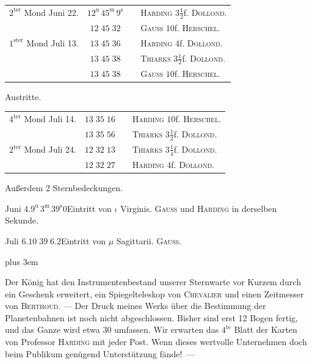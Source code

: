 \begin{center}
\fontsize{10}{12}\selectfont\setlength{\tabcolsep}{3pt}\begin{tabular}{lccl}
$2^{\text{ter}}$ Mond Juni 22. & $12^{\text{u}}\,45^{\text{m}}\,9^{\text{s}}$ & & \textsc{Harding} $3\tfrac12$f. \textsc{Dollond}.\\
& $12\;45\;32$ & & \textsc{Gauss} $10$f. \textsc{Herschel}.\\
$1^{\text{ster}}$ Mond Juli 13. & $13\;45\;36$ & & \textsc{Harding} $4$f. \textsc{Dollond}.\\
& $13\;45\;38$ & & \textsc{Thiarks} $3\tfrac12$f. \textsc{Dollond}.\\
& $13\;45\;38$ & & \textsc{Gauss} $10$f. \textsc{Herschel}.\\
\end{tabular}

Austritte.

\fontsize{10}{12}\selectfont\setlength{\tabcolsep}{3pt}\begin{tabular}{lccl}
$4^{\text{ter}}$ Mond Juli 14. & $13\;35\;16$ & & \textsc{Harding} $10$f. \textsc{Herschel}.\\
& $13\;35\;56$ & & \textsc{Thiarks} $3\tfrac12$f. \textsc{Dollond}.\\
$2^{\text{ter}}$ Mond Juli 24. & $12\;32\;13$ & & \textsc{Thiarks} $3\tfrac14$f. \textsc{Dollond}.\\
& $12\;32\;27$ & & \textsc{Harding} $4$f. \textsc{Dollond}.\\
\end{tabular}
\end{center}

\par\indent Außerdem 2 Sternbedeckungen.

\smallskip
\noindent Juni 4.\quad $9^{\text{u}}\,3^{\text{m}}\,39^{\text{s}}0$\quad Eintritt von $\iota$ Virginis. \textsc{Gauss} und \textsc{Harding} in derselben Sekunde.

\smallskip
\noindent Juli 6.\quad $10\;39\;6.2$\quad Eintritt von $\mu$ Sagittarii. \textsc{Gauss}.

\smallskip
{\rightskip=0pt plus 3em\par\indent Der König hat den Instrumentenbestand unserer Sternwarte vor Kurzem durch ein Geschenk erweitert, ein Spiegelteleskop von \textsc{Chevalier} und einen Zeitmesser von \textsc{Berthoud}. --- Der Druck meines
Werks über die Bestimmung der Planetenbahnen ist noch nicht abgeschlossen. Bisher sind erst 12 Bogen fertig, und das Ganze wird etwa 30 umfassen. Wir erwarten das $4^{\text{te}}$ Blatt der Karten von Professor \textsc{Harding} mit jeder Post. Wenn dieses wertvolle Unternehmen doch beim Publikum genügend Unterstützung fände!~---\par}
